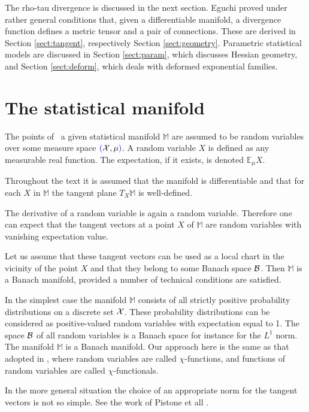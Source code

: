 \documentclass[graybox]{svmult}
\newcommand{\Mo}{\mathbb M}
\newcommand{\Eo}{\mathbb E}
\newcommand{\add}[1]{{\color{blue}#1}}
\newcommand{\remove}[1]{{\color{blue}{\st {#1}}}}
\newcommand{\change}[2]{\remove{#1}\,\add{#2}}
\begin{document}
The rho-tau divergence is discussed in the next section. Eguchi \cite{eguchi1983,eguchi1985}
proved under rather general conditions that, given a differentiable manifold,
a divergence function defines a metric tensor and a pair of connections.
These are derived in Section \ref{sect:tangent}, respectively Section \ref{sect:geometry}.
Parametric statistical models are discussed in Section \ref{sect:param}, which
discusses Hessian geometry, and Section \ref{sect:deform}, which deals with deformed
exponential families.

\section{The statistical manifold}

The points of \change{the}{ a given} statistical manifold
$\Mo$ are assumed to be random variables over some measure space
$\add{(}{\cal X}, \mu\add{)}$. 
\add {A random variable $X$ is defined as any measurable real function.
The expectation, if it exists, is denoted $\Eo_\mu X$.
}
\add{ Throughout the text it is assumed that the manifold is differentiable
and that for each $X$ in $\Mo$ the tangent plane $T_X\Mo$ is well-defined.

}
The \remove{Fr\'echet} 
derivative of a random variable is again a random variable.
Therefore one can expect that
the tangent vectors at a point $X$ of $\Mo$ are random variables with vanishing expectation value.
\add{
Let us assume that these tangent vectors can be used as a local chart in the vicinity of the point $X$
and that they belong to some Banach space $\cal B$.
Then $\Mo$ is a  Banach manifold, provided a number of technical conditions are satisfied.

In the simplest case the manifold $\Mo$ consists of all strictly positive probability distributions
on a discrete set $\cal X$.
These probability distributions can be considered as positive-valued random variables with expectation equal to 1.
The space $\cal B$ of all random variables is a Banach space for instance for the $L^1$ norm.
The manifold $\Mo$ is a Banach manifold.
Our approach here is the same as that adopted in \cite {zhang13},
where random variables are called $\chi$-functions,
and functions of random variables are called $\chi$-functionals.

In the more general situation the choice of an appropriate norm for the tangent vectors is not so simple.
See the work of Pistone et all \cite{pistonesempi1995,pistonerogantin1999,pistone2009}.


}
\end{document}
